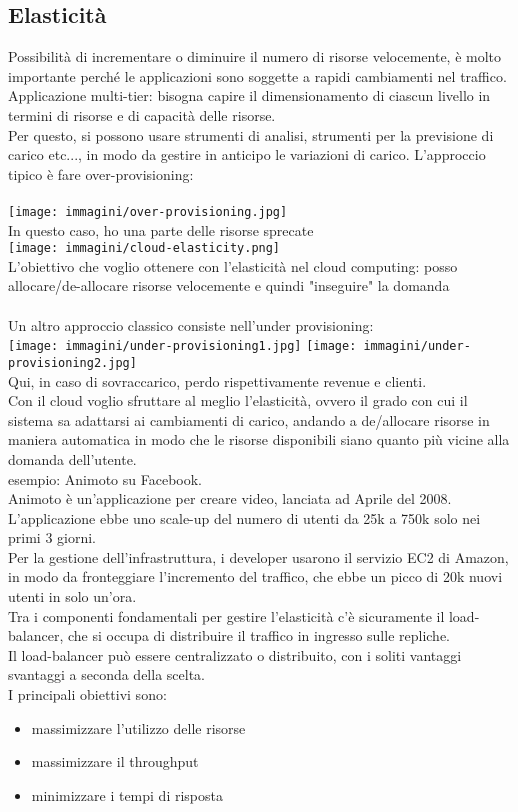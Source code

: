 \documentclass[16px]{article}
\begin{document}
\subsection{Elasticità}
Possibilità di incrementare o diminuire il numero di risorse velocemente, è molto importante perché le applicazioni sono soggette a rapidi cambiamenti nel traffico.\\ Applicazione multi-tier: bisogna capire il dimensionamento di ciascun livello in termini di risorse e di capacità delle risorse.\\ Per questo, si possono usare strumenti di analisi, strumenti per la previsione di carico etc..., in modo da gestire in anticipo le variazioni di carico. L'approccio tipico è fare over-provisioning: \\\\
\texttt{[image: immagini/over-provisioning.jpg]}\\
In questo caso, ho una parte delle risorse sprecate\\
\texttt{[image: immagini/cloud-elasticity.png]}
\\L'obiettivo che voglio ottenere con l'elasticità nel cloud computing: posso allocare/de-allocare risorse velocemente e quindi "inseguire" la domanda\\\\ Un altro approccio classico consiste nell'under provisioning:\\
\texttt{[image: immagini/under-provisioning1.jpg]}
\texttt{[image: immagini/under-provisioning2.jpg]}\\
Qui, in caso di sovraccarico, perdo rispettivamente revenue e clienti.\\ Con il cloud voglio sfruttare al meglio l'elasticità, ovvero il grado con cui il sistema sa adattarsi ai cambiamenti di carico, andando a de/allocare risorse in maniera automatica in modo che le risorse disponibili siano quanto più vicine alla domanda dell'utente.\\
esempio: Animoto su Facebook.\\
Animoto è un'applicazione per creare video, lanciata ad Aprile del 2008. L'applicazione ebbe uno scale-up del numero di utenti da 25k a 750k solo nei primi 3 giorni.\\ Per la gestione dell'infrastruttura, i developer usarono il servizio EC2 di Amazon, in modo da fronteggiare l'incremento del traffico, che ebbe un picco di 20k nuovi utenti in solo un'ora.\\ Tra i componenti fondamentali per gestire l'elasticità c'è sicuramente il load-balancer, che si occupa di distribuire il traffico in ingresso sulle repliche.\\ Il load-balancer può essere centralizzato o distribuito, con i soliti vantaggi  svantaggi a seconda della scelta.\\ I principali obiettivi sono:
\begin{itemize}
\item massimizzare l'utilizzo delle risorse
\item massimizzare il throughput
\item minimizzare i tempi di risposta
\end{itemize}
\end{document}
